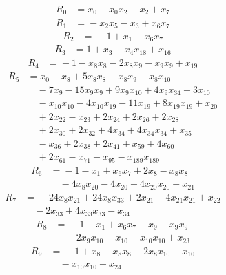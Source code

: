 \begingroup\small
\begin{align*}
R_{0}&={}x_{0} -x_{0}x_{2} -x_{2} +x_{7}
\end{align*}
\begin{align*}
R_{1}&={}-x_{2}x_{5} -x_{3} +x_{6}x_{7}
\end{align*}
\begin{align*}
R_{2}&={}-1 +x_{1} -x_{6}x_{7}
\end{align*}
\begin{align*}
R_{3}&={}1 +x_{3} -x_{4}x_{18} +x_{16}
\end{align*}
\begin{align*}
R_{4}&={}-1 -x_{8}x_{8} -2x_{8}x_{9} -x_{9}x_{9} +x_{19}
\end{align*}
\begin{align*}
R_{5}&={}x_{0} -x_{8} +5x_{8}x_{8} -x_{8}x_{9} -x_{8}x_{10}\\
&\quad{}-7x_{9} -15x_{9}x_{9} +9x_{9}x_{10} +4x_{9}x_{34} +3x_{10}\\
&\quad{}-x_{10}x_{10} -4x_{10}x_{19} -11x_{19} +8x_{19}x_{19} +x_{20}\\
&\quad{}+2x_{22} -x_{23} +2x_{24} +2x_{26} +2x_{28}\\
&\quad{}+2x_{30} +2x_{32} +4x_{34} +4x_{34}x_{34} +x_{35}\\
&\quad{}-x_{36} +2x_{38} +2x_{41} +x_{59} +4x_{60}\\
&\quad{}+2x_{61} -x_{71} -x_{95} -x_{189}x_{189}
\end{align*}
\begin{align*}
R_{6}&={}-1 -x_{1} +x_{6}x_{7} +2x_{8} -x_{8}x_{8}\\
&\quad{}-4x_{8}x_{20} -4x_{20} -4x_{20}x_{20} +x_{21}
\end{align*}
\begin{align*}
R_{7}&={}-24x_{8}x_{21} +24x_{8}x_{33} +2x_{21} -4x_{21}x_{21} +x_{22}\\
&\quad{}-2x_{33} +4x_{33}x_{33} -x_{34}
\end{align*}
\begin{align*}
R_{8}&={}-1 -x_{1} +x_{6}x_{7} -x_{9} -x_{9}x_{9}\\
&\quad{}-2x_{9}x_{10} -x_{10} -x_{10}x_{10} +x_{23}
\end{align*}
\begin{align*}
R_{9}&={}-1 +x_{8} -x_{8}x_{8} -2x_{8}x_{10} +x_{10}\\
&\quad{}-x_{10}x_{10} +x_{24}
\end{align*}
